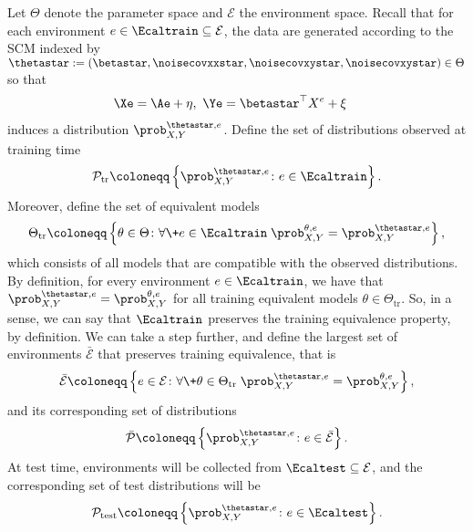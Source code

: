 
Let $\Theta$ denote the parameter space and $\mathcal{E}$ the environment space.
Recall that for each environment $e \in \Ecaltrain \subseteq \mathcal{E}$, the data are generated according to the SCM indexed by $\thetastar := (\betastar, \noisecovxxstar, \noisecovxystar, \noisecovxystar) \in \Theta$ so that
\begin{align*}
    \Xe &= \Ae + \eta, \
    \Ye = \betastar^\top X^e + \xi
\end{align*}
induces a distribution $\prob_{X, Y}^{\thetastar, e}$.
Define the set of distributions observed at training time
\begin{align}
    \mathcal{P}_\mathrm{tr} \coloneqq \left\{\prob_{X, Y}^{\thetastar, e} \colon e \in \Ecaltrain\right\}.
\end{align}
Moreover, define the set of  equivalent models
\begin{align}
    \Theta_\mathrm{tr} \coloneqq \left\{\theta \in \Theta \colon \forall\+ e \in \Ecaltrain\; \prob_{X, Y}^{\theta, e} = \prob_{X, Y}^{\thetastar, e}\right\},
\end{align}
which consists of all models that are compatible with the observed distributions.
By definition, for every environment $e \in \Ecaltrain$, we have that $\prob_{X, Y}^{\thetastar, e} = \prob_{X, Y}^{\theta, e}$ for all training equivalent models $\theta \in \Theta_{\mathrm{tr}}$.
So, in a sense, we can say that $\Ecaltrain$ preserves the training equivalence property, by definition.
We can take a step further, and define the largest set of environments $\bar{\mathcal{E}}$ that preserves training equivalence, that is
\begin{align}\label{eq:larg-set}
    \bar{\mathcal{E}} \coloneqq \left\{e \in \mathcal{E} \colon \forall\+\theta \in \Theta_{\mathrm{tr}}\; \prob_{X, Y}^{\thetastar, e} = \prob_{X, Y}^{\theta, e}\right\},
\end{align}
and its corresponding set of distributions 
\begin{align}
    \bar{\mathcal{P}} \coloneqq \left\{ \prob_{X, Y}^{\thetastar, e} \colon e \in \bar{\mathcal{E}} \right\}.
\end{align}
At test time, environments will be collected from $\Ecaltest \subseteq \mathcal{E}$, and the corresponding set of test distributions will be 
\begin{align}
    \mathcal{P}_\mathrm{test} \coloneqq \left\{ \prob_{X, Y}^{\thetastar, e} \colon e \in \Ecaltest \right\}.
\end{align}
